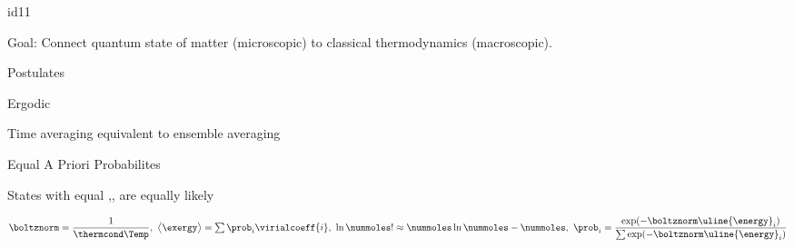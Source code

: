 \begin{mitframe}{id11}

    
\begin{listone}
    
    \item Goal: Connect quantum state of matter (microscopic) to classical thermodynamics (macroscopic).
    
    \item Postulates
    
    \begin{listtwo}
    
    	\item Ergodic
        
        \begin{listthree}
        
    		\item Time averaging equivalent to ensemble averaging

		\end{listthree}

    	\item Equal A Priori Probabilites
        
       	\begin{listthree}
        
    		\item States with equal \nummoles,\uline{\vol},\uline{\energy} are equally likely
    
    	\end{listthree}
    
    \end{listtwo}
    
    \item $\boltznorm = \dfrac{1}{\thermcond\Temp},~\big\langle\exergy\big\rangle = \sum\nolimits\prob_{i}\virialcoeff{i},~\ln\nummoles!\approx \nummoles\ln\nummoles - \nummoles,~\prob_{i} = \dfrac{\exp(-\boltznorm\uline{\energy}_{i})}{\sum\nolimits\exp(-\boltznorm\uline{\energy}_{i})}$
    
\end{listone}

\end{mitframe}